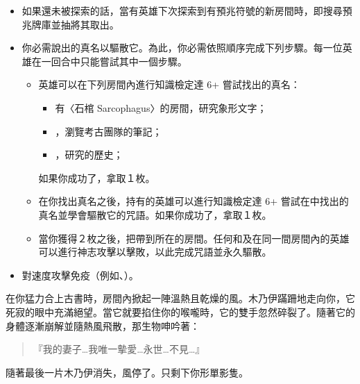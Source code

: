 \vspace*{-1em}
\begin{itemize}
  \item 如果還未被探索的話，當有英雄下次探索到有預兆符號的新房間時，即搜尋預兆牌庫並抽將其取出。
  \item 你必需說出的真名以驅散它。為此，你必需依照順序完成下列步驟。每一位英雄在一回合中只能嘗試其中一個步驟。
    \begin{itemize}
      \item 英雄可以在下列房間內進行知識檢定達 6+ 嘗試找出的真名：
        \begin{itemize}
          \item 有〈石棺 Sarcophagus〉的房間，研究象形文字；
          \item {}，瀏覽考古團隊的筆記；
          \item {}，研究的歷史；
        \end{itemize}
        如果你成功了，拿取１枚。
      \item 在你找出真名之後，持有的英雄可以進行知識檢定達 6+ 嘗試在中找出的真名並學會驅散它的咒語。如果你成功了，拿取１枚。
      \item 當你獲得２枚之後，把帶到所在的房間。任何和及在同一間房間內的英雄可以進行神志攻擊以擊敗，以此完成咒語並永久驅散。
    \end{itemize}
  \item {}對速度攻擊免疫（例如、）。
\end{itemize}

\begin{HauntStory}
  在你猛力合上古書時，房間內掀起一陣溫熱且乾燥的風。木乃伊蹣跚地走向你，它死寂的眼中充滿絕望。當它就要掐住你的喉嚨時，它的雙手忽然碎裂了。隨著它的身體逐漸崩解並隨熱風飛散，那生物呻吟著：
  \begin{quote}
    『我的妻子…我唯一摰愛…永世…不見…』
  \end{quote}
  隨著最後一片木乃伊消失，風停了。只剩下你形單影隻。
\end{HauntStory}
